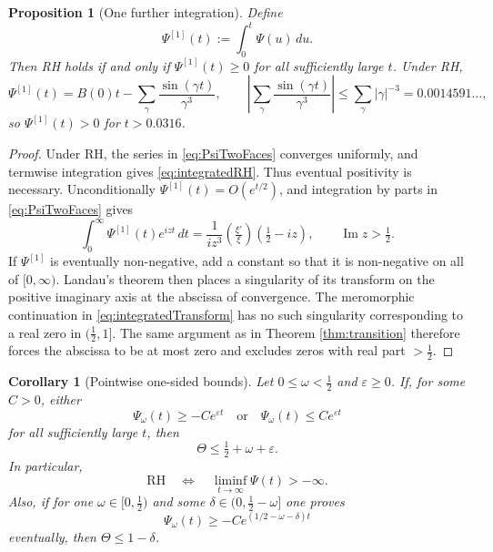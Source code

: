 \documentclass[11pt,reqno]{amsart}
\theoremstyle{plain}
\newtheorem{proposition}[theorem]{Proposition}
\newtheorem{corollary}[theorem]{Corollary}
\theoremstyle{definition}
\newcommand{\Ip}{\operatorname{Im}}
\newcommand{\lxi}[1]{\left(\tfrac{\xi'}{\xi}\right)\!#1}
\begin{document}
\begin{proposition}[One further integration]\label{prop:integrated}
Define
\[
 \Psi^{[1]}(t):=\int_0^t\Psi(u)\,du.
\]
Then RH holds if and only if $\Psi^{[1]}(t)\ge0$ for all sufficiently large $t$.  Under RH,
\begin{equation}\label{eq:integratedRH}
 \Psi^{[1]}(t)=B(0)t-\sum_\gamma\frac{\sin(\gamma t)}{\gamma^3},
 \qquad
 \left|\sum_\gamma\frac{\sin(\gamma t)}{\gamma^3}\right|
 \le \sum_\gamma|\gamma|^{-3}=0.0014591\ldots,
\end{equation}
so $\Psi^{[1]}(t)>0$ for $t>0.0316$.
\end{proposition}

\begin{proof}
Under RH, the series in \eqref{eq:PsiTwoFaces} converges uniformly, and termwise integration gives
\eqref{eq:integratedRH}.  Thus eventual positivity is necessary.  Unconditionally
$\Psi^{[1]}(t)=O(e^{t/2})$, and integration by parts in \eqref{eq:PsiTwoFaces} gives
\begin{equation}\label{eq:integratedTransform}
 \int_0^\infty\Psi^{[1]}(t)e^{izt}\,dt
 =\frac1{iz^3}\lxi{\left(\tfrac12-iz\right)},
 \qquad \Ip z>\tfrac12.
\end{equation}
If $\Psi^{[1]}$ is eventually non-negative, add a constant so that it is non-negative on all of
$[0,\infty)$.  Landau's theorem then places a singularity of its transform on the positive
imaginary axis at the abscissa of convergence.  The meromorphic continuation in
\eqref{eq:integratedTransform} has no such singularity corresponding to a real zero in
$(\tfrac12,1]$.  The same argument as in Theorem \ref{thm:transition} therefore forces the
abscissa to be at most zero and excludes zeros with real part $>\tfrac12$.
\end{proof}

\begin{corollary}[Pointwise one-sided bounds]\label{cor:oneside}
Let $0\le\omega<\tfrac12$ and $\varepsilon\ge0$.
If, for some $C>0$, either
\[
 \Psi_\omega(t)\ge-Ce^{\varepsilon t}
 \quad\text{or}\quad
 \Psi_\omega(t)\le Ce^{\varepsilon t}
\]
for all sufficiently large $t$, then
\begin{equation}\label{eq:onesideConclusion}
 \Theta\le\tfrac12+\omega+\varepsilon.
\end{equation}
In particular,
\begin{equation}\label{eq:RHboundedBelow}
 \mathrm{RH}\quad\Longleftrightarrow\quad
 \liminf_{t\to\infty}\Psi(t)>-\infty.
\end{equation}
Also, if for one $\omega\in[0,\tfrac12)$ and some $\delta\in(0,\tfrac12-\omega]$ one proves
\[
 \Psi_\omega(t)\ge-Ce^{(1/2-\omega-\delta)t}
\]
eventually, then $\Theta\le1-\delta$.
\end{corollary}
\end{document}
